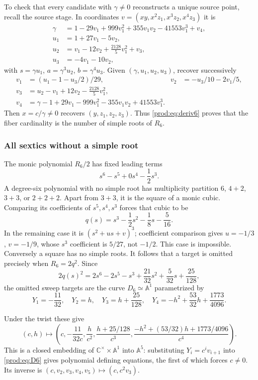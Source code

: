 \documentclass[11pt]{article}
\numberwithin{equation}{section}
\theoremstyle{plain}
\theoremstyle{definition}
\theoremstyle{remark}
\newcommand{\C}{\mathbb{C}}
\newcommand{\A}{\mathbb{A}}
\begin{document}
To check that every candidate with $\gamma\ne0$ reconstructs a unique
source point, recall the source stage. In coordinates
$v=(xy,x^2z_1,x^3z_2,x^4z_3)$ it is
\begin{align*}
 \gamma&=1-29v_1+999v_1^2+355v_1v_2-41553v_1^3+v_4,\\
 u_1&=1+27v_1-5v_2,\\
 u_2&=v_1-12v_2+\frac{2128}{5}v_1^2+v_3,\\
 u_3&=-4v_1-10v_2,
\end{align*}
with $s=\gamma u_1$, $a=\gamma^3u_2$, $b=\gamma^4u_3$.
Given $(\gamma,u_1,u_2,u_3)$, recover successively
\begin{align*}
 v_1&=(u_1-1-u_3/2)/29,&
 v_2&=-u_3/10-2v_1/5,\\
 v_3&=u_2-v_1+12v_2-\frac{2128}{5}v_1^2,\\
 v_4&=\gamma-1+29v_1-999v_1^2-355v_1v_2+41553v_1^3.
\end{align*}
Then $x=c/\gamma\ne0$ recovers $(y,z_1,z_2,z_3)$.
Thus \eqref{prod:eq:deriv6} proves that the fiber cardinality is the number
of simple roots of $R_6$.

\subsubsection{All sextics without a simple root}
The monic polynomial $R_6/2$ has fixed leading terms
\[
 s^6-s^5+0s^4-\frac12s^3.
\]
A degree-six polynomial with no simple root has multiplicity partition
$6$, $4+2$, $3+3$, or $2+2+2$. Apart from $3+3$, it is the square of a
monic cubic. Comparing its coefficients of $s^5,s^4,s^3$ forces that cubic to be
\[
 q(s)=s^3-\frac12s^2-\frac18s-\frac5{16}.
\]
In the remaining case it is $(s^2+us+v)^3$; coefficient comparison gives
$u=-1/3$, $v=-1/9$, whose $s^3$ coefficient is $5/27$, not $-1/2$.
This case is impossible. Conversely a square has no simple roots.
It follows that a target is omitted precisely when $R_6=2q^2$.
Since
\[
 2q(s)^2=2s^6-2s^5-s^3+\frac{21}{32}s^2+\frac5{32}s+\frac{25}{128},
\]
the omitted sweep targets are the curve $D_6\simeq\A^1$ parametrized by
\begin{equation}\label{prod:eq:D6}
 Y_1=-\frac{11}{32},\quad Y_2=h,\quad
 Y_3=h+\frac{25}{128},\quad
 Y_4=-h^2+\frac{53}{32}h+\frac{1773}{4096}.
\end{equation}

Under the twist these give
\[
 (c,h)\longmapsto
 \left(c,-\frac{11}{32c},\frac{h}{c^2},
 \frac{h+25/128}{c^3},
 \frac{-h^2+(53/32)h+1773/4096}{c^4}\right).
\]
This is a closed embedding of $\C^\times\times\A^1$ into $\A^5$:
substituting $Y_i=c^iv_{i+1}$ into \eqref{prod:eq:D6} gives polynomial
defining equations, the first of which forces $c\ne0$.
Its inverse is $(c,v_2,v_3,v_4,v_5)\mapsto(c,c^2v_3)$.
\end{document}
